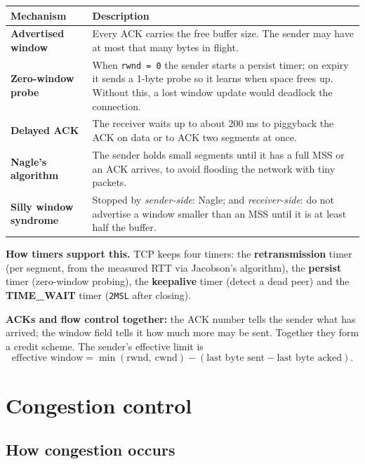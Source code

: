 \documentclass[11pt,a4paper]{article}
\begin{document}
\begin{solbox}
\begin{center}\small
\begin{tabularx}{\textwidth}{>{\bfseries}p{} X}
\toprule Mechanism & Description\\
\midrule
Advertised window & Every ACK carries the free buffer size. The sender may have at most that many bytes in flight.\\
Zero-window probe & When \texttt{rwnd = 0} the sender starts a persist timer; on expiry it sends a 1-byte probe so it learns when space frees up. Without this, a lost window update would deadlock the connection.\\
Delayed ACK & The receiver waits up to about 200 ms to piggyback the ACK on data or to ACK two segments at once.\\
Nagle's algorithm & The sender holds small segments until it has a full MSS or an ACK arrives, to avoid flooding the network with tiny packets.\\
Silly window syndrome & Stopped by \emph{sender-side}: Nagle; and \emph{receiver-side}: do not advertise a window smaller than an MSS until it is at least half the buffer.\\
\bottomrule
\end{tabularx}
\end{center}

\textbf{How timers support this.} TCP keeps four timers: the \textbf{retransmission} timer (per segment, from the measured RTT via Jacobson's algorithm), the \textbf{persist} timer (zero-window probing), the \textbf{keepalive} timer (detect a dead peer) and the \textbf{TIME\_WAIT} timer (\texttt{2MSL} after closing).

\textbf{ACKs and flow control together:} the ACK number tells the sender what has arrived; the window field tells it how much more may be sent. Together they form a credit scheme. The sender's effective limit is
\[
\text{effective window} = \min(\text{rwnd},\ \text{cwnd}) - (\text{last byte sent} - \text{last byte acked}).
\]
\end{solbox}

\section{Congestion control}

\subsection{How congestion occurs}
\end{document}
